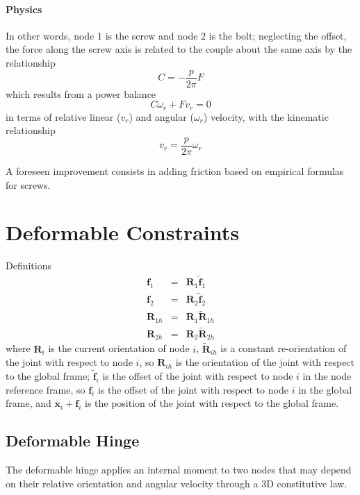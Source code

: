 \documentclass[10pt,dvips]{report}
\newcommand{\T}[1]{\boldsymbol{#1}}
\begin{document}
\paragraph{Physics}
In other words, node 1 is the screw and node 2 is the bolt;
neglecting the offset, the force along the screw axis is related
to the couple about the same axis by the relationship
\begin{equation*}
	C = - \frac{p}{2\pi} F
\end{equation*}
which results from a power balance
\begin{equation*}
	C \omega_r + F v_r = 0
\end{equation*}
in terms of relative linear ($v_r$) and angular ($\omega_r$) velocity,
with the kinematic relationship
\begin{equation*} 
	v_r = \frac{p}{2\pi} \omega_r
\end{equation*}

A foreseen improvement consists in adding friction based on empirical
formulas for screws.







\section{Deformable Constraints}
Definitions
\begin{eqnarray*}
	\T{f}_1 & = & \T{R}_1 \tilde{\T{f}}_1 \\
	\T{f}_2 & = & \T{R}_2 \tilde{\T{f}}_2 \\
	\T{R}_{1h} & = & \T{R}_1 \tilde{\T{R}}_{1h} \\
	\T{R}_{2h} & = & \T{R}_2 \tilde{\T{R}}_{2h}
\end{eqnarray*}
where $\T{R}_i$ is the current orientation of node $i$, 
$\tilde{\T{R}}_{ih}$ is a constant re-orientation of the joint
with respect to node $i$, so $\T{R}_{ih}$ is the orientation
of the joint with respect to the global frame;
$\tilde{\T{f}}_i$ is the offset of the joint with respect to
node $i$ in the node reference frame, so $\T{f}_i$ is the offset 
of the joint with respect to node $i$ in the global frame, and
$\T{x}_i+\T{f}_i$ is the position of the joint with respect 
to the global frame.


\subsection{Deformable Hinge}
The deformable hinge applies an internal moment to two nodes that may depend
on their relative orientation and angular velocity through a 3D constitutive law.
\end{document}
